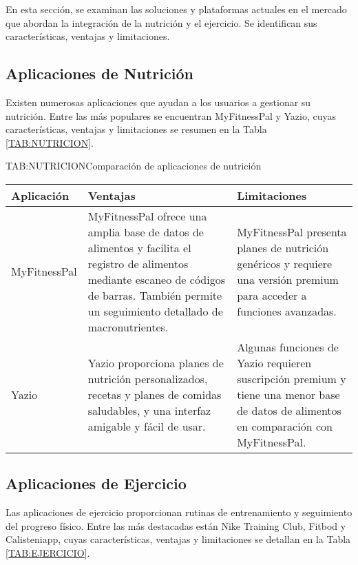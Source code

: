 En esta sección, se examinan las soluciones y plataformas actuales en el mercado que abordan la integración de la nutrición y el ejercicio. Se identifican sus características, ventajas y limitaciones.

\subsection{Aplicaciones de Nutrición}

Existen numerosas aplicaciones que ayudan a los usuarios a gestionar su nutrición. Entre las más populares se encuentran MyFitnessPal y Yazio, cuyas características, ventajas y limitaciones se resumen en la Tabla \ref{TAB:NUTRICION}.

\begin{table}[Comparación de aplicaciones de nutrición]{TAB:NUTRICION}{Comparación de aplicaciones de nutrición}
  \begin{tabular}{|p{3cm}|p{5cm}|p{5cm}|}
    \hline
    \textbf{Aplicación} & \textbf{Ventajas} & \textbf{Limitaciones} \\
    \hline
    MyFitnessPal & MyFitnessPal ofrece una amplia base de datos de alimentos y facilita el registro de alimentos mediante escaneo de códigos de barras. También permite un seguimiento detallado de macronutrientes. & MyFitnessPal presenta planes de nutrición genéricos y requiere una versión premium para acceder a funciones avanzadas. \\
    \hline
    Yazio & Yazio proporciona planes de nutrición personalizados, recetas y planes de comidas saludables, y una interfaz amigable y fácil de usar. & Algunas funciones de Yazio requieren suscripción premium y tiene una menor base de datos de alimentos en comparación con MyFitnessPal. \\
    \hline
  \end{tabular}
\end{table}

\subsection{Aplicaciones de Ejercicio}

Las aplicaciones de ejercicio proporcionan rutinas de entrenamiento y seguimiento del progreso físico. Entre las más destacadas están Nike Training Club, Fitbod y Calisteniapp, cuyas características, ventajas y limitaciones se detallan en la Tabla \ref{TAB:EJERCICIO}.

